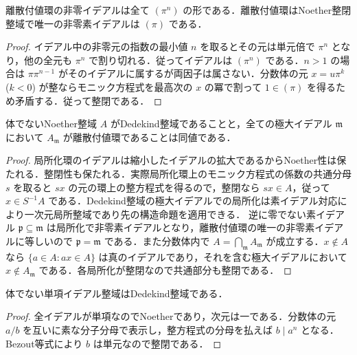\begin{prop}[離散付値環のイデアル]
離散付値環の非零イデアルは全て $(\pi^n)$ の形である．離散付値環はNoether整閉整域で唯一の非零素イデアルは $(\pi)$ である．
\end{prop}
\begin{proof}
イデアル中の非零元の指数の最小値 $n$ を取るとその元は単元倍で $\pi^n$ となり，他の全元も $\pi^n$ で割り切れる．従ってイデアルは $(\pi^n)$ である．$n>1$ の場合は $\pi\pi^{n-1}$ がそのイデアルに属するが両因子は属さない．分数体の元 $x=u\pi^k$ ($k<0$) が整ならモニック方程式を最高次の $x$ の冪で割って $1\in(\pi)$ を得るため矛盾する．従って整閉である．
\end{proof}
\begin{prop}[Dedekind整域の局所的特徴づけ]
体でないNoether整域 $A$ がDedekind整域であることと，全ての極大イデアル $\mathfrak m$ において $A_{\mathfrak m}$ が離散付値環であることは同値である．
\end{prop}
\begin{proof}
局所化環のイデアルは縮小したイデアルの拡大であるからNoether性は保たれる．整閉性も保たれる．実際局所化環上のモニック方程式の係数の共通分母 $s$ を取ると $sx$ の元の環上の整方程式を得るので，整閉なら $sx\in A$，従って $x\in S^{-1}A$ である．Dedekind整域の極大イデアルでの局所化は素イデアル対応により一次元局所整域であり先の構造命題を適用できる．
逆に零でない素イデアル $\mathfrak p\subseteq\mathfrak m$ は局所化で非零素イデアルとなり，離散付値環の唯一の非零素イデアルに等しいので $\mathfrak p=\mathfrak m$ である．また分数体内で $A=\bigcap_{\mathfrak m}A_{\mathfrak m}$ が成立する．$x\notin A$ なら $\{a\in A:ax\in A\}$ は真のイデアルであり，それを含む極大イデアルにおいて $x\notin A_{\mathfrak m}$ である．各局所化が整閉なので共通部分も整閉である．
\end{proof}
\begin{example}[単項イデアル整域の例]
体でない単項イデアル整域はDedekind整域である．
\end{example}
\begin{proof}
全イデアルが単項なのでNoetherであり，次元は一である．分数体の元 $a/b$ を互いに素な分子分母で表示し，整方程式の分母を払えば $b\mid a^n$ となる．Bezout等式により $b$ は単元なので整閉である．
\end{proof}
